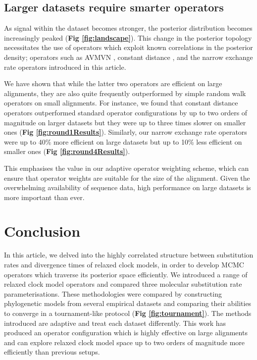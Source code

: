 \documentclass[10pt,letterpaper]{article}
\begin{document}
	
	
\subsection*{Larger datasets require smarter operators}

As signal within the dataset becomes stronger, the posterior distribution becomes increasingly peaked (\textbf{Fig \ref{fig:landscape}}).
This change in the posterior topology necessitates the use of operators which exploit known correlations in the posterior density; operators such as AVMVN \cite{baele2017adaptive}, constant distance \cite{zhang2020improving}, and the narrow exchange rate operators introduced in this article.

We have shown that while the latter two operators are efficient on large alignments, they are also quite frequently outperformed by simple random walk operators on small alignments.
For instance, we found that constant distance operators outperformed standard operator configurations by up to two orders of magnitude on larger datasets but they were up to three times slower on smaller ones (\textbf{Fig \ref{fig:round1Results}}). 
Similarly, our narrow exchange rate operators were up to 40\% more efficient on large datasets but up to 10\% less efficient on smaller ones (\textbf{Fig \ref{fig:round4Results}}).

This emphasises the value in our adaptive operator weighting scheme, which can ensure that operator weights are suitable for the size of the alignment.
Given the overwhelming availability of sequence data, high performance on large datasets is more important than ever.



\section*{Conclusion}

In this article, we delved into the highly correlated structure between substitution rates and divergence times of relaxed clock models, in order to develop MCMC operators which traverse its posterior space efficiently.
We introduced a range of relaxed clock model operators and compared three molecular substitution rate parameterisations.
These methodologies were compared by constructing phylogenetic models from several empirical datasets and comparing their abilities to converge in a tournament-like protocol (\textbf{Fig \ref{fig:tournament}}).
The methods introduced are adaptive and treat each dataset differently.
This work has produced an operator configuration which is highly effective  on large alignments and can explore relaxed clock model space up to two orders of magnitude more efficiently than previous setups.
\end{document}
